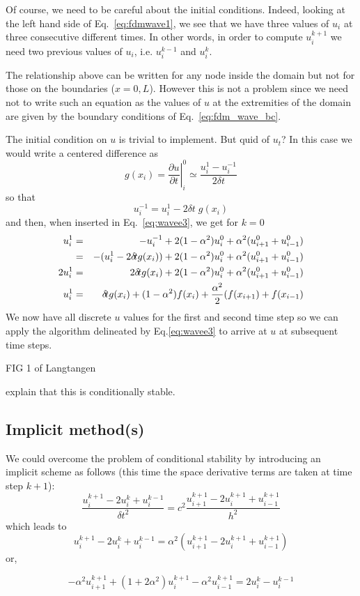 Of course, we need to be careful about the initial conditions. Indeed, looking 
at the left hand side of Eq.~\eqref{eq:fdmwave1}, we see that we have three values of $u_i$
at three consecutive different times.
In other words, in order to compute $u_i^{k+1}$ we need two previous values 
of $u_i$, i.e. $u_i^{k-1}$ and $u_{i}^k$. 

The relationship above can be written for any node inside the domain but not for those on the 
boundaries ($x=0,L$). However this is not a problem since we need not to write such an equation
as the values of $u$ at the extremities of the domain are given by the boundary conditions of 
Eq.~\eqref{eq:fdm_wave_bc}.

The initial condition on $u$ is trivial to implement. But quid of $u_t$? In this case we would 
write a centered difference as 
\[
g(x_i)=\left. \frac{\partial u}{\partial t} \right|_{i}^0 \simeq \frac{u_i^1-u_i^{-1}}{2 \delta \! t} 
\]
so that 
\[
u_i^{-1} = u_i^1 - 2 \delta \! t \; g(x_i)
\]
and then, when inserted in Eq.~\eqref{eq:wavee3}, we get for $k=0$
\begin{eqnarray}
u_i^{1} 
&=& - u_i^{-1} +2(1-\alpha^2) u_{i}^0 + \alpha^2 (u_{i+1}^0 +u_{i-1}^0)  \nonumber\\
&=& - (u_i^1 - 2 \delta \! t g(x_i))  +2(1-\alpha^2) u_{i}^0 + \alpha^2 (u_{i+1}^0 +u_{i-1}^0)  \nonumber\\
2 u_i^1 &=& 2 \delta \! t g(x_i)  +2(1-\alpha^2) u_{i}^0 + \alpha^2 (u_{i+1}^0 +u_{i-1}^0)  \nonumber\\
u_i^1 &=&  \delta \! t g(x_i)  + (1-\alpha^2) f(x_{i}) + \frac{\alpha^2}{2} (f(x_{i+1}) + f(x_{i-1}) \nonumber\\
\end{eqnarray}
We now have all discrete $u$ values for the first and second time step so we can  
apply the algorithm delineated by Eq.\eqref{eq:wavee3} to arrive at $u$ at subsequent time steps.

FIG 1 of Langtangen

{\color{red} explain that this is conditionally stable.}

\subsection{Implicit method(s)}

We could overcome the problem of conditional stability by 
introducing an implicit scheme as follows (this time 
the space derivative terms are taken at time step $k+1$):
\[
\frac{ u_i^{k+1} -2u_i^{k} +u_i^{k-1}  }{\delta\! t^2} = 
c^2
\frac{ u_{i+1}^{k+1} -2u_{i}^{k+1} +u_{i-1}^{k+1}  }{h^2} 
\]
which leads to 
\[
u_i^{k+1} -2u_i^{k} +u_i^{k-1}  = 
\alpha ^2 ( u_{i+1}^{k+1} -2u_{i}^{k+1} +u_{i-1}^{k+1} )
\]
or,
\begin{mdframed}[backgroundcolor=blue!5]
\begin{equation}
-\alpha^2 u_{i+1}^{k+1}+
(1+2\alpha^2) u_i^{k+1} 
-\alpha^2 u_{i-1}^{k+1}
=2 u_i^k -u_i^{k-1}
\end{equation}
\end{mdframed}

